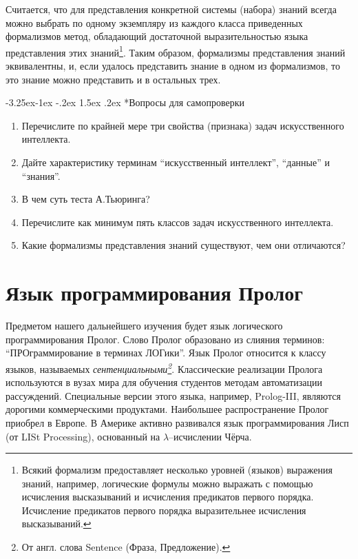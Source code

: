 \documentclass[12pt, openany, twoside]{book} %
\makeatletter
\renewcommand\subsubsection{\@startsection{subsubsection}{3}{\z@}%
                                     {-3.25ex\@plus -1ex \@minus -.2ex}%
                                     {1.5ex \@plus .2ex}%
                                     {\normalfont\normalsize\bfseries}}
\newenvironment{questions}{\subsubsection*{Вопросы для самопроверки}\begin{enumerate}}{\end{enumerate}}
\makeatother
\begin{document}
\medskip{} Считается, что для представления конкретной системы (набора) знаний всегда можно выбрать по одному экземпляру из каждого класса приведенных формализмов метод, обладающий достаточной выразительностью языка представления этих знаний\footnote{Всякий формализм предоставляет несколько уровней (языков) выражения знаний, например, логические формулы можно выражать с помощью исчисления высказываний и исчисления предикатов первого порядка. Исчисление предикатов первого порядка выразительнее исчисления высказываний.}. Таким образом, формализмы представления знаний эквивалентны, и, если удалось представить знание в одном из формализмов, то это знание можно представить и в остальных трех.

\begin{questions}
\item{} Перечислите по крайней мере три свойства (признака) задач искусственного интеллекта.
\item{} Дайте характеристику терминам ``искусственный интеллект'', ``данные'' и ``знания''.
\item{} В чем суть теста А.Тьюринга?
\item{} Перечислите как минимум пять классов задач искусственного интеллекта.
\item{} Какие формализмы представления знаний существуют, чем они отличаются?
\end{questions}

\chapter{Язык программирования Пролог}

Предметом нашего дальнейшего изучения будет язык логического программирования Пролог. Слово Пролог образовано из слияния терминов: ``ПРОграммирование в терминах ЛОГики''. Язык Пролог относится к классу языков, называемых {\em сентенциальными\footnote{От англ. слова Sentence (Фраза, Предложение).}}.  Классические реализации Пролога используются в вузах мира для обучения студентов методам автоматизации рассуждений. Специальные версии этого языка, например, Prolog-III, являются дорогими коммерческими продуктами. Наибольшее распространение Пролог приобрел в Европе. В Америке активно развивался язык программирования Лисп (от LISt Processing), основанный на $\lambda$--исчислении Чёрча. %
\end{document}
